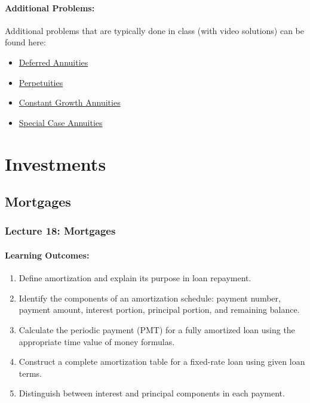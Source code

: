 \documentclass[
]{book}
\providecommand{\tightlist}{%
  \setlength{\itemsep}{0pt}\setlength{\parskip}{0pt}}
\begin{document}
\subsection*{Additional Problems:}\label{additional-problems-16}

Additional problems that are typically done in class (with video solutions) can be found here:

\begin{itemize}
\item
  \href{https://theelementsmath.github.io/M114/more-on-annuities.html\#deferred-annuities}{Deferred Annuities}
\item
  \href{https://theelementsmath.github.io/M114/more-on-annuities.html\#perpetuities}{Perpetuities}
\item
  \href{https://theelementsmath.github.io/M114/more-on-annuities.html\#constant-growth-annuities}{Constant Growth Annuities}
\item
  \href{https://theelementsmath.github.io/M114/more-on-annuities.html\#special-case-annuities}{Special Case Annuities}
\end{itemize}

\part{Investments}\label{part-investments}

\chapter{Mortgages}\label{mortgages}

\section*{Lecture 18: Mortgages}\label{lecture-18-mortgages}

\subsection*{Learning Outcomes:}\label{learning-outcomes-17}

\begin{enumerate}
\def\labelenumi{\arabic{enumi}.}
\tightlist
\item
  Define amortization and explain its purpose in loan repayment.
\item
  Identify the components of an amortization schedule: payment number, payment amount, interest portion, principal portion, and remaining balance.
\item
  Calculate the periodic payment (PMT) for a fully amortized loan using the appropriate time value of money formulas.
\item
  Construct a complete amortization table for a fixed-rate loan using given loan terms.
\item
  Distinguish between interest and principal components in each payment.
\end{enumerate}
\end{document}
